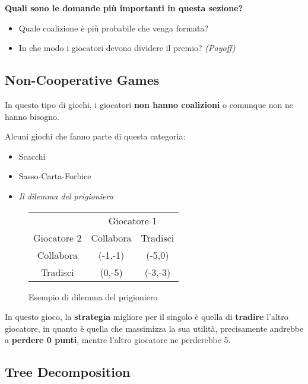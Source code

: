 \textbf{Quali sono le domande più importanti in questa sezione?}
\begin{itemize}
    \item Quale coalizione è più probabile che venga formata?
    \item In che modo i giocatori devono dividere il premio? \textit{(Payoff)}
\end{itemize}

\subsection{Non-Cooperative Games}
\label{sub:non_cooperative_games}

In questo tipo di giochi, i giocatori \textbf{non hanno coalizioni} o comunque
non ne hanno bisogno.

Alcuni giochi che fanno parte di questa categoria:
\begin{itemize}
    \item Scacchi
    \item Sasso-Carta-Forbice
    \item \textit{Il dilemma del prigioniero}
\end{itemize}

\begin{figure}[H]
    \begin{center}
        \begin{tabular}{c|cc}
            \multicolumn{1}{c}{} & \multicolumn{2}{c}{Giocatore 1}            \\
            \cline{2-3}
            Giocatore 2          & Collabora                       & Tradisci \\
            \cline{1-3}
            Collabora            & (-1,-1)                         & (-5,0)   \\
            Tradisci             & (0,-5)                          & (-3,-3)  \\
            \cline{1-3}
        \end{tabular}
    \end{center}
    \caption{Esempio di dilemma del prigioniero}
\end{figure}

In questo gioco, la \textbf{strategia} migliore per il singolo è quella di
\textbf{tradire} l'altro giocatore, in quanto è quella che massimizza la sua
utilità, precisamente andrebbe a \textbf{perdere 0 punti}, mentre l'altro
giocatore ne perderebbe 5.

\subsection{Tree Decomposition}
\label{sub:tree_decomposition}

